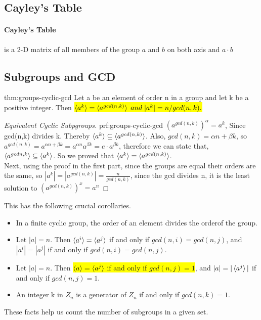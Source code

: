 \subsection{Cayley's Table}

\paragraph{Cayley's Table} is a 2-D matrix of all members of the group $a$ and $b$ on both axis and $a \cdot b$

\subsection{Subgroups and GCD}

\begin{theorem}{thm:groups-cyclic-gcd}
    Let a be an element of order n in a group and let k be a positive integer. Then
    \colorbox{yellow}{$ \braket{a^k} = \braket{a^{gcd(n,k)}}\;and\;|a^k| = n/gcd(n, k). $}
\end{theorem}

\begin{proof}[Equivalent Cyclic Subpgroups]{prf:groups-cyclic-gcd}
    $(a^{gcd(n,k)})^{\alpha} = a^k$, Since gcd(n,k) divides k. Thereby $ \braket{a^{k}} \subseteq \braket{a^{gcd(n,k)}}$.
    Also, $gcd(n,k) = \alpha n + \beta k$, so $a^{gcd(n,k)} = a^{\alpha n + \beta k} = a^{\alpha n} a^{\beta k} = e \cdot a^{\beta k}$, therefore we can state that, $\braket{a^{gcd{n,k}}} \subseteq \braket{a^k}$. So we proved that $\braket{a^k} = \braket{a^{gcd(n,k)}}$.
    \vspace{10pt} \\ Next, using the proof in the first part, since the groups are equal their orders are the same, so
    $|a^{k}| = |a^{gcd(n,k)}| = \frac{n}{gcd(n,k)}$, since the gcd divides n, it is the least solution to $(a^{gcd(n,k)})^x = a^n$
\end{proof}

This has the following crucial corollaries.
\begin{itemize}
    \item In a finite cyclic group, the order of an element divides the orderof the group.
    \item Let $|a| = n$. Then $\braket{a^i} = \braket{a^j}$ if and only if $gcd(n, i) = gcd(n, j)$, and $|a^i| = |a^j|$ if and only if $gcd(n, i) = gcd(n, j)$.
    \item Let $|a| = n$. Then \colorbox{yellow}{$\braket{a} = \braket{a^j}$ if and only if $gcd(n, j) = 1$}, and $|a| = |\braket{a^j}|$ if and only if $gcd(n, j) = 1$.
    \item An integer k in $Z_n$ is a generator of $Z_n$ if and only if $gcd(n, k) = 1$.
\end{itemize}
These facts help us count the number of subgroups in a given set.


